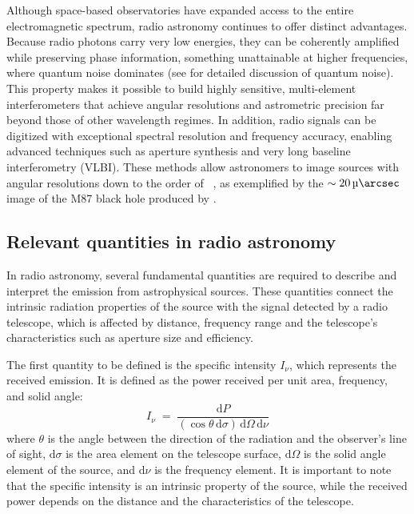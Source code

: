Although space-based observatories have expanded access to the entire electromagnetic spectrum, radio astronomy continues to offer distinct advantages. Because radio photons carry very low energies, they can be coherently amplified while preserving phase information, something unattainable at higher frequencies, where quantum noise dominates (see \citet{RevModPhys.82.1155} for detailed discussion of quantum noise). This property makes it possible to build highly sensitive, multi-element interferometers that achieve angular resolutions and astrometric precision far beyond those of other wavelength regimes. In addition, radio signals can be digitized with exceptional spectral resolution and frequency accuracy, enabling advanced techniques such as aperture synthesis and very long baseline interferometry (VLBI). These methods allow astronomers to image sources with angular resolutions down to the order of \si{\micro\arcsec}, as exemplified by the $\sim\SI{20}{\micro\arcsec}$ image of the M87 black hole produced by \cite{Akiyama_2019}.
\subsection{Relevant quantities in radio astronomy}
In radio astronomy, several fundamental quantities are required to describe and interpret the emission from astrophysical sources. These quantities connect the intrinsic radiation properties of the source with the signal detected by a radio telescope, which is affected by distance, frequency range and the telescope's characteristics such as aperture size and efficiency.


The first quantity to be defined is the specific intensity $I_\nu$, which represents the received emission. It is defined as the power received per unit area, frequency, and solid angle:
\begin{equation}
	I_\nu \;=\; \frac{\mathrm{d}P}{ (\cos\theta \, \mathrm{d}\sigma) \, \mathrm{d}\Omega \, \mathrm{d}\nu}
\end{equation}
where $\theta$ is the angle between the direction of the radiation and the observer's line of sight, $\mathrm{d}\sigma$ is the area element on the telescope surface, $\mathrm{d}\Omega$ is the solid angle element of the source, and $\mathrm{d}\nu$ is the frequency element. It is important to note that the specific intensity is an intrinsic property of the source, while the received power depends on the distance and the characteristics of the telescope.


